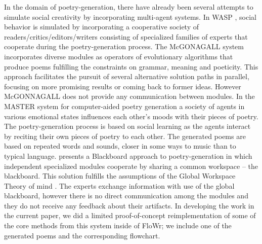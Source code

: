 In the domain of poetry-generation, there have already been several attempts to simulate social creativity by incorporating multi-agent systems. 
%
In WASP \cite{gervas10}, social behavior is simulated by incorporating a cooperative society of readers/critics/editors/writers consisting of specialized families of experts that cooperate during the poetry-generation process.
%
The McGONAGALL system \cite{manurung12} incorporates diverse modules as operators of evolutionary algorithms that produce poems fulfilling the constraints on grammar, meaning and poeticity.  This approach facilitates the pursuit of several alternative solution paths in parallel, focusing on more promising results or coming back to former ideas. However McGONNAGALL does not provide any communication between modules.
%
In the MASTER system for computer-aided poetry generation \cite{kirke13} a society of agents in various emotional states influences each other's moods with their pieces of poetry. The poetry-generation process is based on social learning as the agents interact by reciting their own pieces of poetry to each other. The generated poems are based on repeated words and sounds, closer in some ways to music than to typical language.
%
\cite{misztal2014poetry} presents a Blackboard approach to poetry-generation in which independent specialized modules cooperate by sharing a common workspace -- the blackboard. This solution fulfills the assumptions of  the Global Workspace Theory of mind  \cite{baars97}. The experts exchange information with use of the global blackboard, however there is no direct communication among the modules and they do not receive any feedback about their artifacts.  In developing the work in the current paper, we did a limited proof-of-concept reimplementation of some of the core methods from this system inside of FloWr; we include one of the generated poems and the corresponding flowchart.



